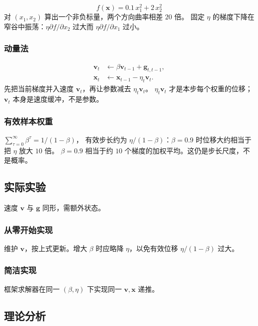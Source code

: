 \[
f(\bm{x})=0.1\,x_1^2+2\,x_2^2
\]
对 $(x_1,x_2)$ 算出一个非负标量，两个方向曲率相差 $20$ 倍。
固定 $\eta$ 的梯度下降在窄谷中振荡：$\eta\partial f/\partial x_2$ 过大而 $\eta\partial f/\partial x_1$ 过小。

\subsubsection{动量法}

\begin{align*}
\bm{v}_t&\leftarrow\beta\bm{v}_{t-1}+\bm{g}_{t,t-1},
\\
\bm{x}_t&\leftarrow\bm{x}_{t-1}-\eta_t\bm{v}_t.
\end{align*}
先把当前梯度并入速度 $\bm{v}_t$，再让参数减去 $\eta_t\bm{v}_t$。
$\eta_t\bm{v}_t$ 才是本步每个权重的位移；$\bm{v}_t$ 本身是速度缓冲，不是参数。

\subsubsection{有效样本权重}

$\sum_{\tau=0}^{\infty}\beta^{\tau}=1/(1-\beta)$，
有效步长约为 $\eta/(1-\beta)$：$\beta=0.9$ 时位移大约相当于把 $\eta$ 放大 $10$ 倍。
$\beta=0.9$ 相当于约 $10$ 个梯度的加权平均。这仍是步长尺度，不是概率。

\subsection{实际实验}

速度 $\bm{v}$ 与 $\bm{g}$ 同形，需额外状态。

\subsubsection{从零开始实现}

维护 $\bm{v}$，按上式更新。增大 $\beta$ 时应略降 $\eta$，以免有效位移 $\eta/(1-\beta)$ 过大。

\subsubsection{简洁实现}

框架求解器在同一 $(\beta,\eta)$ 下实现同一 $\bm{v},\bm{x}$ 递推。

\subsection{理论分析}

